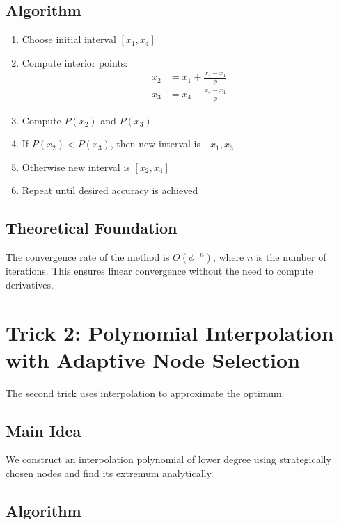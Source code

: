\documentclass[12pt,a4paper]{article}
\begin{document}
\subsection{Algorithm}

\begin{enumerate}
    \item Choose initial interval $[x_1, x_4]$
    \item Compute interior points:
    \begin{align}
        x_2 &= x_1 + \frac{x_4 - x_1}{\phi} \\
        x_3 &= x_4 - \frac{x_4 - x_1}{\phi}
    \end{align}
    \item Compute $P(x_2)$ and $P(x_3)$
    \item If $P(x_2) < P(x_3)$, then new interval is $[x_1, x_3]$
    \item Otherwise new interval is $[x_2, x_4]$
    \item Repeat until desired accuracy is achieved
\end{enumerate}

\subsection{Theoretical Foundation}

The convergence rate of the method is $O(\phi^{-n})$, where $n$ is the number of iterations. This ensures linear convergence without the need to compute derivatives.

\section{Trick 2: Polynomial Interpolation with Adaptive Node Selection}

The second trick uses interpolation to approximate the optimum.

\subsection{Main Idea}

We construct an interpolation polynomial of lower degree using strategically chosen nodes and find its extremum analytically.

\subsection{Algorithm}
\end{document}
